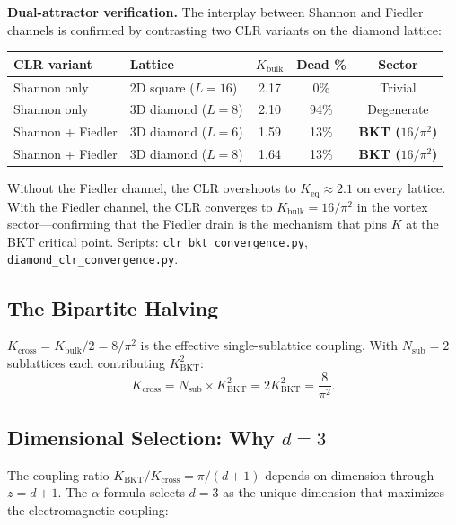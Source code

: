 \documentclass[aps,prd,onecolumn,superscriptaddress,floatfix,12pt]{revtex4-2}
\newcommand{\Kbulk}{K_{\text{bulk}}}
\newcommand{\KBKT}{K_{\text{BKT}}}
\begin{document}
\noindent\textbf{Dual-attractor verification.} The interplay between Shannon and Fiedler channels is confirmed by contrasting two CLR variants on the diamond lattice:

\begin{center}
\begin{tabular}{llccc}
\toprule
CLR variant & Lattice & $\Kbulk$ & Dead \% & Sector \\
\midrule
Shannon only & 2D square ($L{=}16$) & 2.17 & 0\% & Trivial \\
Shannon only & 3D diamond ($L{=}8$) & 2.10 & 94\% & Degenerate \\
Shannon + Fiedler & 3D diamond ($L{=}6$) & 1.59 & 13\% & \textbf{BKT ($16/\pi^2$)} \\
Shannon + Fiedler & 3D diamond ($L{=}8$) & 1.64 & 13\% & \textbf{BKT ($16/\pi^2$)} \\
\bottomrule
\end{tabular}
\end{center}

Without the Fiedler channel, the CLR overshoots to $K_{\text{eq}} \approx 2.1$ on every lattice. With the Fiedler channel, the CLR converges to $\Kbulk = 16/\pi^2$ in the vortex sector---confirming that the Fiedler drain is the mechanism that pins $K$ at the BKT critical point. Scripts: \texttt{clr\_bkt\_convergence.py}, \texttt{diamond\_clr\_convergence.py}.

\subsection{The Bipartite Halving}\label{sec:5-6}

$K_{\text{cross}} = \Kbulk/2 = 8/\pi^2$ is the effective single-sublattice coupling. With $N_{\text{sub}} = 2$ sublattices each contributing $\KBKT^2$:
\begin{equation}
K_{\text{cross}} = N_{\text{sub}} \times \KBKT^2 = 2\KBKT^2 = \frac{8}{\pi^2}.
\end{equation}

\subsection{Dimensional Selection: Why $d = 3$}\label{sec:5-7}

The coupling ratio $\KBKT/K_{\text{cross}} = \pi/(d{+}1)$ depends on dimension through $z = d + 1$. The $\alpha$ formula selects $d = 3$ as the unique dimension that maximizes the electromagnetic coupling:
\end{document}
